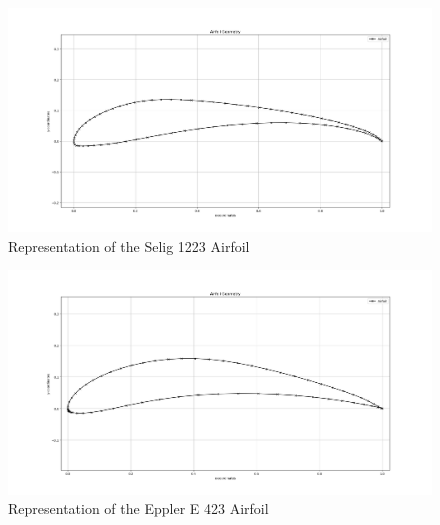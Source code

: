 \begin{figure}[H]\centering
\includegraphics[scale=\size]{Content/Images/Selig_1223_Sketch.png}
\caption{Representation of the Selig 1223 Airfoil}
\label{Selig_Sketch}
\end{figure}
\begin{figure}[H]\centering
\includegraphics[scale=\size]{Content/Images/Eppler_E_423.png}
\caption{Representation of the Eppler E 423 Airfoil}
\label{Eppler_Sketch}
\end{figure}



